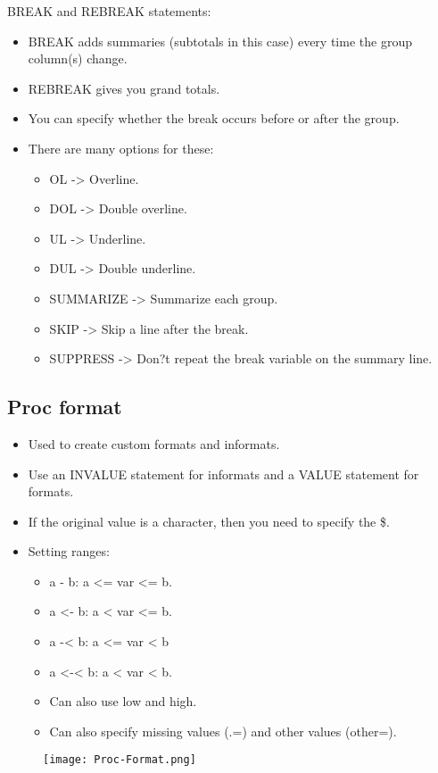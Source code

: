 \documentclass[11pt, oneside]{article}
\begin{document}
BREAK and REBREAK statements:
\begin{itemize}
\item BREAK adds summaries (subtotals in this case) every time the group column(s) change.
\item REBREAK gives you grand totals.
\item You can specify whether the break occurs before or after the group.
\item There are many options for these:
	\begin{itemize}
	\item OL -> Overline.
	\item DOL -> Double overline.
	\item UL -> Underline.
	\item DUL -> Double underline.
	\item SUMMARIZE -> Summarize each group.
	\item SKIP -> Skip a line after the break.
	\item SUPPRESS -> Don?t repeat the break variable on the summary line.
	\end{itemize} 
\end{itemize}



\subsection{Proc format}

\begin{itemize}
\item Used to create custom formats and informats.
\item Use an INVALUE statement for informats and a VALUE statement for formats.
\item If the original value is a character, then you need to specify the \$.
\item Setting ranges:
	\begin{itemize}
	\item a - b: a <= var <= b.
	\item a <- b: a < var <= b.
	\item a -< b: a <= var < b
	\item a <-< b: a < var < b.
	\item Can also use low and high.
	\item Can also specify missing values (.=) and other values (other=).
	\end{itemize}
\end{itemize}

\begin{figure}[H]
\texttt{[image: Proc-Format.png]}
\end{figure}
\end{document}
